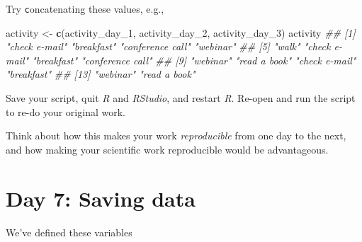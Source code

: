 \documentclass[]{book}
\newenvironment{Shaded}{\begin{snugshade}}{\end{snugshade}}
\newcommand{\CommentTok}[1]{\textcolor[rgb]{0.56,0.35,0.01}{\textit{#1}}}
\newcommand{\DecValTok}[1]{\textcolor[rgb]{0.00,0.00,0.81}{#1}}
\newcommand{\KeywordTok}[1]{\textcolor[rgb]{0.13,0.29,0.53}{\textbf{#1}}}
\newcommand{\NormalTok}[1]{#1}
\newcommand{\StringTok}[1]{\textcolor[rgb]{0.31,0.60,0.02}{#1}}
\begin{document}
Try \texttt{c}oncatenating these values, e.g.,

\begin{Shaded}
\begin{Highlighting}[]
\NormalTok{activity <-}\StringTok{ }\KeywordTok{c}\NormalTok{(activity_day_}\DecValTok{1}\NormalTok{, activity_day_}\DecValTok{2}\NormalTok{, activity_day_}\DecValTok{3}\NormalTok{)}
\NormalTok{activity}
\CommentTok{##  [1] "check e-mail"    "breakfast"       "conference call" "webinar"        }
\CommentTok{##  [5] "walk"            "check e-mail"    "breakfast"       "conference call"}
\CommentTok{##  [9] "webinar"         "read a book"     "check e-mail"    "breakfast"      }
\CommentTok{## [13] "webinar"         "read a book"}
\end{Highlighting}
\end{Shaded}

Save your script, quit \emph{R} and \emph{RStudio}, and restart \emph{R}. Re-open and run the script to re-do your original work.

Think about how this makes your work \emph{reproducible} from one day to the next, and how making your scientific work reproducible would be advantageous.

\hypertarget{day-7-saving-data}{%
\section{Day 7: Saving data}\label{day-7-saving-data}}

We've defined these variables
\end{document}
